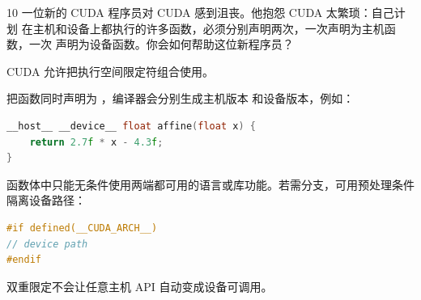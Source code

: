\begin{solutionexercise}{10}
\problemheading 一位新的 CUDA 程序员对 CUDA 感到沮丧。他抱怨 CUDA 太繁琐：自己计划
在主机和设备上都执行的许多函数，必须分别声明两次，一次声明为主机函数，一次
声明为设备函数。你会如何帮助这位新程序员？

\approachheading CUDA 允许把执行空间限定符组合使用。

\answerheading 把函数同时声明为 ，编译器会分别生成主机版本
和设备版本，例如：
\begin{lstlisting}[language=C++]
__host__ __device__ float affine(float x) {
    return 2.7f * x - 4.3f;
}
\end{lstlisting}
函数体中只能无条件使用两端都可用的语言或库功能。若需分支，可用预处理条件隔离设备路径：
\begin{lstlisting}[language=C++,numbers=none]
#if defined(__CUDA_ARCH__)
// device path
#endif
\end{lstlisting}
双重限定不会让任意主机 API 自动变成设备可调用。


\end{solutionexercise}
